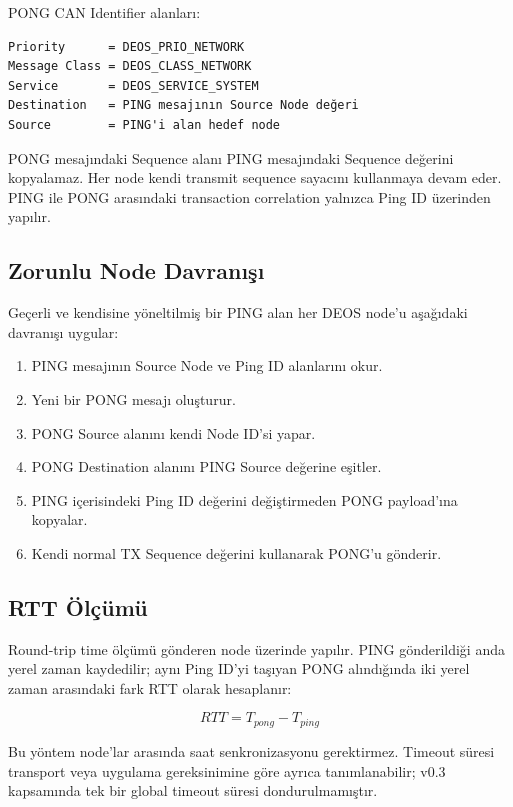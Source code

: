 \documentclass[a4paper,10pt]{article}
\begin{document}
PONG CAN Identifier alanları:

\begin{verbatim}
Priority      = DEOS_PRIO_NETWORK
Message Class = DEOS_CLASS_NETWORK
Service       = DEOS_SERVICE_SYSTEM
Destination   = PING mesajının Source Node değeri
Source        = PING'i alan hedef node
\end{verbatim}

PONG mesajındaki Sequence alanı PING mesajındaki Sequence değerini kopyalamaz. Her node
kendi transmit sequence sayacını kullanmaya devam eder. PING ile PONG arasındaki transaction
correlation yalnızca Ping ID üzerinden yapılır.

\subsection{Zorunlu Node Davranışı}

Geçerli ve kendisine yöneltilmiş bir PING alan her DEOS node'u aşağıdaki davranışı uygular:

\begin{enumerate}
    \item PING mesajının Source Node ve Ping ID alanlarını okur.
    \item Yeni bir PONG mesajı oluşturur.
    \item PONG Source alanını kendi Node ID'si yapar.
    \item PONG Destination alanını PING Source değerine eşitler.
    \item PING içerisindeki Ping ID değerini değiştirmeden PONG payload'ına kopyalar.
    \item Kendi normal TX Sequence değerini kullanarak PONG'u gönderir.
\end{enumerate}

\subsection{RTT Ölçümü}

Round-trip time ölçümü gönderen node üzerinde yapılır. PING gönderildiği anda yerel zaman
kaydedilir; aynı Ping ID'yi taşıyan PONG alındığında iki yerel zaman arasındaki fark RTT
olarak hesaplanır:

\[
RTT = T_{pong} - T_{ping}
\]

Bu yöntem node'lar arasında saat senkronizasyonu gerektirmez. Timeout süresi transport veya
uygulama gereksinimine göre ayrıca tanımlanabilir; v0.3 kapsamında tek bir global timeout
süresi dondurulmamıştır.
\end{document}
